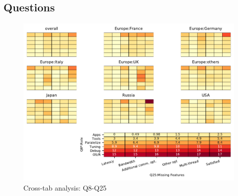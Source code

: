 
\subsection{Questions}


\begin{figure}
\begin{center}
\includegraphics[width=12cm]{../pdfs/Q8-Q25.pdf}
\caption{Cross-tab analysis: Q8-Q25}
\label{fig:Q8-Q25}
\end{center}
\end{figure}
